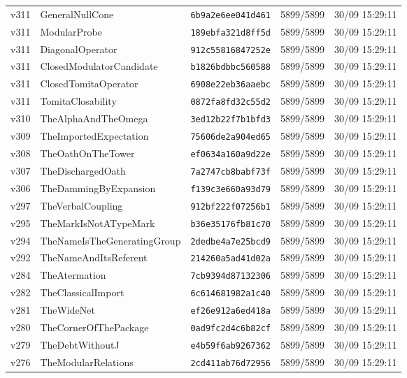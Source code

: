 \documentclass[11pt]{article}
\theoremstyle{definition}\newtheorem{deriv}{Derivação}
\begin{document}
{\begin{longtable}{@{}lllll@{}}
v311 & GeneralNullCone & \texttt{6b9a2e6ee041d461} & 5899/5899 & 30/09 15:29:11 \\
v311 & ModularProbe & \texttt{189ebfa321d8ff5d} & 5899/5899 & 30/09 15:29:11 \\
v311 & DiagonalOperator & \texttt{912c55816847252e} & 5899/5899 & 30/09 15:29:11 \\
v311 & ClosedModulatorCandidate & \texttt{b1826bdbbc560588} & 5899/5899 & 30/09 15:29:11 \\
v311 & ClosedTomitaOperator & \texttt{6908e22eb36aaebc} & 5899/5899 & 30/09 15:29:11 \\
v311 & TomitaClosability & \texttt{0872fa8fd32c55d2} & 5899/5899 & 30/09 15:29:11 \\
v310 & TheAlphaAndTheOmega & \texttt{3ed12b22f7b1bfd3} & 5899/5899 & 30/09 15:29:11 \\
v309 & TheImportedExpectation & \texttt{75606de2a904ed65} & 5899/5899 & 30/09 15:29:11 \\
v308 & TheOathOnTheTower & \texttt{ef0634a160a9d22e} & 5899/5899 & 30/09 15:29:11 \\
v307 & TheDischargedOath & \texttt{7a2747cb8babf73f} & 5899/5899 & 30/09 15:29:11 \\
v306 & TheDammingByExpansion & \texttt{f139c3e660a93d79} & 5899/5899 & 30/09 15:29:11 \\
v297 & TheVerbalCoupling & \texttt{912bf222f07256b1} & 5899/5899 & 30/09 15:29:11 \\
v295 & TheMarkIsNotATypeMark & \texttt{b36e35176fb81c70} & 5899/5899 & 30/09 15:29:11 \\
v294 & TheNameIsTheGeneratingGroup & \texttt{2dedbe4a7e25bcd9} & 5899/5899 & 30/09 15:29:11 \\
v292 & TheNameAndItsReferent & \texttt{214260a5ad41d02a} & 5899/5899 & 30/09 15:29:11 \\
v284 & TheAtermation & \texttt{7cb9394d87132306} & 5899/5899 & 30/09 15:29:11 \\
v282 & TheClassicalImport & \texttt{6c614681982a1c40} & 5899/5899 & 30/09 15:29:11 \\
v281 & TheWideNet & \texttt{ef26e912a6ed418a} & 5899/5899 & 30/09 15:29:11 \\
v280 & TheCornerOfThePackage & \texttt{0ad9fc2d4c6b82cf} & 5899/5899 & 30/09 15:29:11 \\
v279 & TheDebtWithoutJ & \texttt{e4b59f6ab9267362} & 5899/5899 & 30/09 15:29:11 \\
v276 & TheModularRelations & \texttt{2cd411ab76d72956} & 5899/5899 & 30/09 15:29:11 \\

\end{longtable}}
\end{document}
